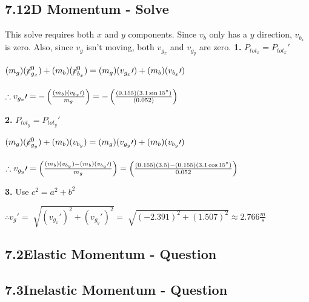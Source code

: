 \documentclass{article}
\begin{document}
\begin{adjustwidth}{1cm}{0pt}
    \subsection*{7.1\hspace*{0.5cm}2D Momentum - Solve}
    This solve requires both $x$ and $y$ components. Since $v_{b}$ only has a $y$ direction, $v_{b_{x}}$ is zero. Also, since $v_{g}$ isn't moving, both $v_{g_{x}}$ and $v_{g_{y}}$ are zero.\newline\newline
    \textbf{1.} $P_{tot_{x}} = P_{tot_{x}}\prime$ \\
    \begin{adjustwidth}{0.6cm}{0pt}
        $(m_{g})(\cancel{v}_{g_{x}}^0) + (m_{b})(\cancel{v}_{b_{x}}^0) = (m_{g})(v_{g_{x}}\prime) + (m_{b})(v_{b_{x}}\prime)$ \\\\
        $\therefore v_{g_{x}}\prime = -\left(\frac{(m_{b})(v_{b_{x}}\prime)}{m_{g}}\right) = -\left(\frac{(0.155)(3.1\sin15\degree)}{(0.052)}\right)$
    \end{adjustwidth}\vspace*{15pt}
    \textbf{2.} $P_{tot_{y}} = P_{tot_{y}}\prime$ \\
    \begin{adjustwidth}{0.6cm}{0pt}
        $(m_{g})(\cancel{v}_{g_{y}}^0) + (m_{b})(v_{b_{y}}) = (m_{g})(v_{g_{y}}\prime) + (m_{b})(v_{b_{y}}\prime)$ \\\\
        $\therefore v_{g_{y}}\prime = \left(\frac{(m_{b})(v_{b_{y}}) - (m_{b})(v_{b_{y}}\prime)}{m_{g}}\right) = \left(\frac{(0.155)(3.5) - (0.155)(3.1\cos15\degree)}{0.052}\right)$
    \end{adjustwidth}\vspace*{15pt}
    \noindent\textbf{3.} Use $c^2 = a^2 + b^2$ \\
    \begin{adjustwidth}{0.6cm}{0pt}
        $\therefore v_{g}\prime = \sqrt[]{{(v_{g_{x}}\prime)}^2 + {(v_{g_{y}}\prime)}^2} = \sqrt[]{{(-2.391)}^2 + {(1.507)}^2} \approx 2.766 \frac{m}{s} $
    \end{adjustwidth}

    \subsection*{7.2\hspace*{0.5cm}Elastic Momentum - Question}


    \subsection*{7.3\hspace*{0.5cm}Inelastic Momentum - Question}



\end{adjustwidth}
\end{document}
